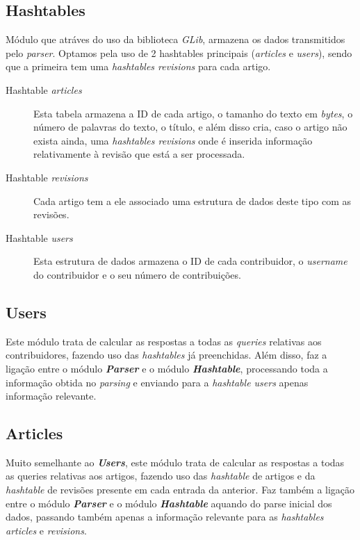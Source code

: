 \documentclass[a4paper]{article}
\begin{document}
\subsection{Hashtables}
Módulo que atráves do uso da biblioteca \textit{GLib}, armazena os dados transmitidos pelo \textit{parser}. Optamos pela uso de 2 hashtables principais (\textit{articles} e \textit{users}), sendo que a primeira tem uma \textit{hashtables revisions} para cada artigo.
\begin{description}
    \item[Hashtable \textit{articles}] Esta tabela armazena a ID de cada artigo, o tamanho do texto em \textit{bytes}, o número de palavras do texto, o título, e além disso cria, caso o artigo não exista ainda, uma \textit{hashtables revisions} onde é inserida informação relativamente à revisão que está a ser processada.

    \item[Hashtable \textit{revisions}] Cada artigo tem a ele associado uma estrutura de dados deste tipo com as revisões.

    \item[Hashtable \textit{users}] Esta estrutura de dados armazena o ID de cada contribuidor, o \textit{username} do contribuidor e o seu número de contribuições.

\end{description}

\subsection{Users}
 Este módulo trata de calcular as respostas a todas as \textit{queries} relativas aos contribuidores, fazendo uso das \textit{hashtables} já preenchidas. Além disso, faz a ligação entre o módulo \textbf{\textit{Parser}} e o módulo \textbf{\textit{Hashtable}}, processando toda a informação obtida no \textit{parsing} e enviando para a \textit{hashtable users} apenas informação relevante.

\subsection{Articles}
 Muito semelhante ao \textbf{\textit{Users}}, este módulo trata de calcular as respostas a todas as queries relativas aos artigos, fazendo uso das \textit{hashtable} de artigos e da \textit{hashtable} de revisões presente em cada entrada da anterior. Faz também a ligação entre o módulo \textbf{\textit{Parser}} e o módulo \textbf{\textit{Hashtable}} aquando do parse inicial dos dados, passando também apenas a informação relevante para as \textit{hashtables articles} e \textit{revisions}.
\end{document}
